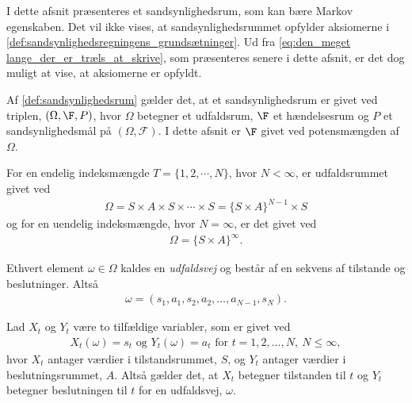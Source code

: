 I dette afsnit præsenteres et sandsynlighedsrum, som kan bære Markov egenskaben. Det vil ikke vises, at sandsynlighedsrummet opfylder aksiomerne i \autoref{def:sandsynlighedsregningens_grundsætninger}. Ud fra \eqref{eq:den_meget lange_der_er_træls_at_skrive}, som præsenteres senere i dette afsnit, er det dog muligt at vise, at aksiomerne er opfyldt.

Af \autoref{def:sandsynlighedsrum} gælder det, at et sandsynlighedsrum er givet ved triplen, $(\Omega, \F, P)$, hvor $\Omega$ betegner et udfaldsrum, $\F$ et hændelsesrum og $P$ et sandsynlighedsmål på $(\Omega,\mathcal{F})$. I dette afsnit er $\F$ givet ved potensmængden af $\Omega$.

For en endelig indeksmængde $T=\{1, 2,\cdots, N\}$, hvor $N<\infty$, er udfaldsrummet givet ved
\begin{align*}
    \Omega = S \times A \times S \times \cdots \times S = \{S \times A\}^{N-1} \times S
\end{align*}
og for en uendelig indeksmængde, hvor $N=\infty$, er det givet ved
\begin{align*}
    \Omega = \{S \times A\}^\infty.
\end{align*}

Ethvert element $\omega \in \Omega$ kaldes en \textit{udfaldsvej} og består af en sekvens af tilstande og beslutninger. Altså
\begin{align*}
    \omega=(s_1 , a_1 , s_2 , a_2 , \dots , a_{N-1} , s_N).
\end{align*}

Lad $X_t$ og $Y_t$ være to tilfældige variabler, som er givet ved
\begin{align*}
    X_t(\omega) = s_t \text{ og } Y_t(\omega) = a_t \text{ for } t=1,2,\dots, N, \  N\leq \infty,
\end{align*}
hvor $X_t$ antager værdier i tilstandsrummet, $S$, og $Y_t$ antager værdier i beslutningsrummet, $A$. Altså gælder det, at $X_t$ betegner tilstanden til $t$ og $Y_t$ betegner beslutningen til $t$ for en udfaldsvej, $\omega$.

